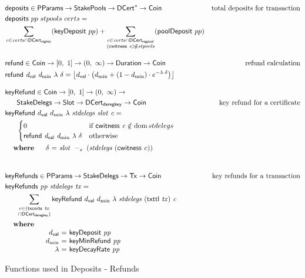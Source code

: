 \begin{figure}[htb]
  \begin{align*}
    & \fun{deposits} \in \PParams \to \StakePools \to \seqof{\DCert} \to \Coin
    & \text{total deposits for transaction} \\
    & \fun{deposits}~{pp}~{stpools}~{certs} = \\
    &  \sum\limits_{c\in\var{certs} \cap \DCertRegKey}(\fun{keyDeposit}~pp)
    +  \sum\limits_{\substack{
         c\in\var{certs}\cap\DCertRegPool \\ (\cwitness{c})\notin \var{stpools}}}
         (\fun{poolDeposit}~pp)
      \nextdef
      & \fun{refund} \in \Coin \to \unitInterval \to \posReals \to \Duration \to \Coin
      & \text{refund calculation} \\
      & \refund{\dval}{d_{\min}}{\lambda}{\delta} =
            \floor*{
              \dval \cdot
            \left(d_{\min}+(1-d_{\min})\cdot e^{-\lambda\cdot\delta}\right)}
      \nextdef
      & \fun{keyRefund} \in \Coin \to \unitInterval \to \posReals \to \\
      & ~~~~~\StakeDelegs \to \Slot \to \DCertDeRegKey \to \Coin
      & \text{key refund for a certificate} \\
      & \keyRefund{\dval}{d_{\min}}{\lambda}{stdelegs}{slot}{c} =\\
      & ~~~~~\begin{cases}
            0 & \text{if}~\cwitness c \notin \dom stdelegs \\
            \refund{\dval}{d_{\min}}{\lambda}{\delta}
            & \text{otherwise}
        \end{cases}\\
      &
      \begin{array}{lr@{~=~}l}
        \where
        &\delta & \slotminus{slot}{(stdelegs~(\cwitness c))}\\
      \end{array}\\
      \nextdef
      & \fun{keyRefunds} \in \PParams \to \StakeDelegs \to \Tx \to \Coin
      & \text{key refunds for a transaction} \\
      & \keyRefunds{pp}{stdelegs}{tx} =\\
      & ~~~~~ \sum\limits_{\substack{c \in (\txcerts{tx} \\ \cap \DCertDeRegKey)}}
              \keyRefund{\dval}{d_{\min}}{\lambda}{stdelegs}{(\txttl{tx})}{c}\\
      &
      \begin{array}{lr@{~=~}l}
        \where \\
        & \dval & \fun{keyDeposit}~\var{pp}\\
        & d_{\min} & \fun{keyMinRefund}~\var{pp}\\
        & \lambda & \fun{keyDecayRate}~\var{pp}\\
      \end{array}\\
  \end{align*}
  \caption{Functions used in Deposits - Refunds}
  \label{fig:functions:deposits-refunds}
\end{figure}

